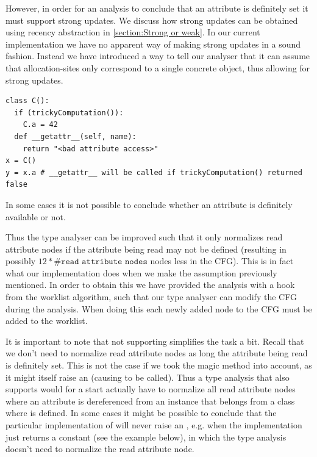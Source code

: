 However, in order for an analysis to conclude that an attribute is definitely set it must support strong updates. We discuss how strong updates can be obtained using recency abstraction in \autoref{section:Strong or weak}. In our current implementation we have no apparent way of making strong updates in a sound fashion. Instead we have introduced a way to tell our analyser that it can assume that allocation-sites only correspond to a single concrete object, thus allowing for strong updates.

\begin{listing}[H]
  \begin{verbatim}
class C():
  if (trickyComputation()):
    C.a = 42
  def __getattr__(self, name):
    return "<bad attribute access>"
x = C()
y = x.a # __getattr__ will be called if trickyComputation() returned false
  \end{verbatim}
  \caption{In some cases it is not possible to conclude whether an attribute is definitely available or not.}
  \label{ex:DefinitelyAvailable}
\end{listing}

Thus the type analyser can be improved such that it only normalizes read attribute nodes if the attribute being read may not be defined (resulting in possibly $12 * \#\texttt{read attribute nodes}$ nodes less in the CFG). This is in fact what our implementation does when we make the assumption previously mentioned. In order to obtain this we have provided the analysis with a hook from the worklist algorithm, such that our type analyser can modify the CFG during the analysis. When doing this each newly added node to the CFG must be added to the worklist.

It is important to note that not supporting  simplifies the task a bit. Recall that we don't need to normalize read attribute nodes as long the attribute being read is definitely set. This is not the case if we took the magic method  into account, as it might itself raise an  (causing  to be called). Thus a type analysis that also supports  would for a start actually have to normalize all read attribute nodes where an attribute is dereferenced from an instance that belongs from a class where  is defined. In some cases it might be possible to conclude that the particular implementation of  will never raise an , e.g. when the implementation just returns a constant (see the example below), in which the type analysis doesn't need to normalize the read attribute node.

